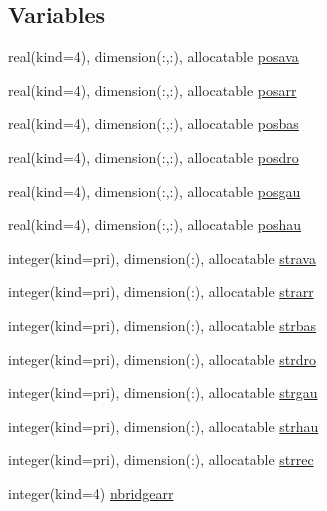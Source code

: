 \subsection*{Variables}
\begin{DoxyCompactItemize}
\item 
real(kind=4), dimension(\+:,\+:), allocatable \hyperlink{namespacemodfofmpi_a91f992ee7447a7fb3c5430233f3f39ab}{posava}
\item 
real(kind=4), dimension(\+:,\+:), allocatable \hyperlink{namespacemodfofmpi_a240c326e64798f0d4f7fd2a785eaddfb}{posarr}
\item 
real(kind=4), dimension(\+:,\+:), allocatable \hyperlink{namespacemodfofmpi_abd8afe0852ff1d0298955d285cb4f001}{posbas}
\item 
real(kind=4), dimension(\+:,\+:), allocatable \hyperlink{namespacemodfofmpi_a1ca3754d2490a28a6596589818c19aba}{posdro}
\item 
real(kind=4), dimension(\+:,\+:), allocatable \hyperlink{namespacemodfofmpi_a420a314f84492aec68a773c09730981d}{posgau}
\item 
real(kind=4), dimension(\+:,\+:), allocatable \hyperlink{namespacemodfofmpi_a940b15087397a154e933785ff862d1aa}{poshau}
\item 
integer(kind=pri), dimension(\+:), allocatable \hyperlink{namespacemodfofmpi_a2cc07767e1b2a2462fc2eeaaef5f5b0a}{strava}
\item 
integer(kind=pri), dimension(\+:), allocatable \hyperlink{namespacemodfofmpi_adc11b8c24e402c222ddf9d339aece63c}{strarr}
\item 
integer(kind=pri), dimension(\+:), allocatable \hyperlink{namespacemodfofmpi_a18f63a61d3cf10a560030f18385646d6}{strbas}
\item 
integer(kind=pri), dimension(\+:), allocatable \hyperlink{namespacemodfofmpi_a6f52fb3f19368ce1dbad562162f6d4b5}{strdro}
\item 
integer(kind=pri), dimension(\+:), allocatable \hyperlink{namespacemodfofmpi_a59d3a040e03ea0312701cf16ded04071}{strgau}
\item 
integer(kind=pri), dimension(\+:), allocatable \hyperlink{namespacemodfofmpi_a9ace6e4f0b23785f3b93fe1812b07c08}{strhau}
\item 
integer(kind=pri), dimension(\+:), allocatable \hyperlink{namespacemodfofmpi_ada00af1a25f50e826521e9b2a7ecb633}{strrec}
\item 
integer(kind=4) \hyperlink{namespacemodfofmpi_a887d577430624ed6c6e8952b089e0576}{nbridgearr}
\item 

\end{DoxyCompactItemize}
